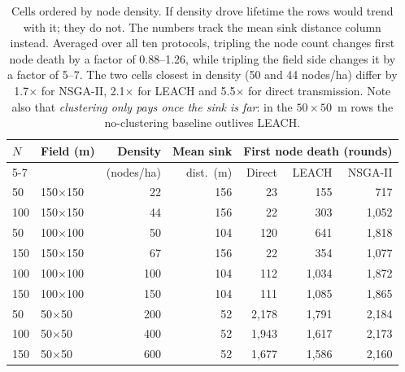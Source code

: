 \begin{table}[!t]
\caption{Cells ordered by node density. If density drove lifetime the rows would trend with it; they do not. The numbers track the mean sink distance column instead. Averaged over all ten protocols, tripling the node count changes first node death by a factor of 0.88--1.26, while tripling the field side changes it by a factor of 5--7. The two cells closest in density (50 and 44 nodes/ha) differ by 1.7$\times$ for NSGA-II, 2.1$\times$ for LEACH and 5.5$\times$ for direct transmission. Note also that \emph{clustering only pays once the sink is far}: in the $50\times50$~m rows the no-clustering baseline outlives LEACH.}
\label{tab:scale-density}
\centering
\begin{tabular}{llrrrrr}
\toprule
$N$ & Field (m) & Density & Mean sink & \multicolumn{3}{c}{First node death (rounds)} \\
\cmidrule(lr){5-7}
 & & (nodes/ha) & dist.\ (m) & Direct & LEACH & NSGA-II \\
\midrule
50 & 150$\times$150 & 22 & 156 & 23 & 155 & 717 \\
100 & 150$\times$150 & 44 & 156 & 22 & 303 & 1,052 \\
50 & 100$\times$100 & 50 & 104 & 120 & 641 & 1,818 \\
150 & 150$\times$150 & 67 & 156 & 22 & 354 & 1,077 \\
100 & 100$\times$100 & 100 & 104 & 112 & 1,034 & 1,872 \\
150 & 100$\times$100 & 150 & 104 & 111 & 1,085 & 1,865 \\
50 & 50$\times$50 & 200 & 52 & 2,178 & 1,791 & 2,184 \\
100 & 50$\times$50 & 400 & 52 & 1,943 & 1,617 & 2,173 \\
150 & 50$\times$50 & 600 & 52 & 1,677 & 1,586 & 2,160 \\
\bottomrule
\end{tabular}
\end{table}
